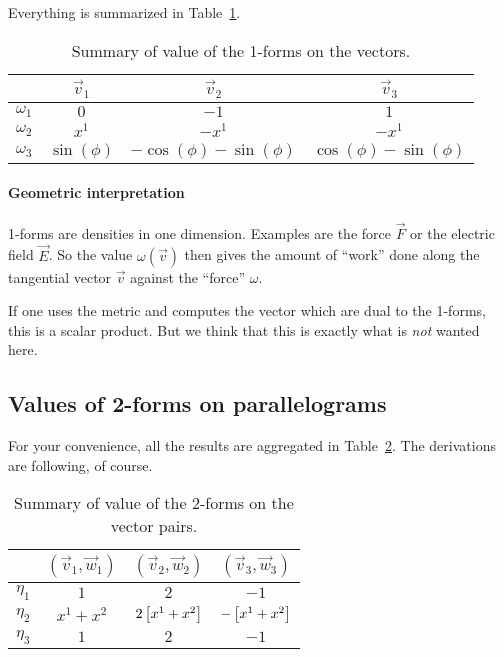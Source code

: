 \documentclass[11pt, english, fleqn, DIV=15, headinclude, BCOR=1cm]{scrartcl}
\begin{document}
Everything is summarized in Table~\ref{tab:values}.

\begin{table}[htbp]
    \centering
    \begin{tabular}{c|ccc}
        & $\vec v_1$ & $\vec v_2$ & $\vec v_3$ \\
        \midrule
        $\omega_1$ & $0$ & $-1$ & $1$ \\
        $\omega_2$ & $x^1$ & $- x^1$ & $- x^1$ \\
        $\omega_3$ & $\sin(\phi)$ & $-\cos(\phi) - \sin(\phi)$ & $\cos(\phi) - \sin(\phi)$ \\
    \end{tabular}
    \caption{%
        Summary of value of the 1-forms on the vectors.
    }
    \label{tab:values}
\end{table}

\paragraph{Geometric interpretation}

1-forms are densities in one dimension. Examples are the force $\vec F$ or the
electric field $\vec E$. So the value $\omega(\vec v)$ then gives the amount of
“work” done along the tangential vector $\vec v$ against the “force” $\omega$.

If one uses the metric and computes the vector which are dual to the 1-forms,
this is a scalar product. But we think that this is exactly what is \emph{not}
wanted here.

\subsection{Values of 2-forms on parallelograms}

For your convenience, all the results are aggregated in
Table~\ref{tab:values2}. The derivations are following, of course.

\begin{table}[htbp]
    \centering
    \begin{tabular}{c|ccc}
        & $(\vec v_1, \vec w_1)$ & $(\vec v_2, \vec w_2)$ & $(\vec v_3, \vec w_3)$ \\
        \midrule
        $\eta_1$ & $1$ & $2$ & $-1$ \\
        $\eta_2$ & $x^1+x^2$ & $2\left[ x^1+x^2 \right]$ & $-\left[ x^1+x^2 \right]$ \\
        $\eta_3$ & $1$ & $2$ & $-1$
    \end{tabular}
    \caption{%
        Summary of value of the 2-forms on the vector pairs.
    }
    \label{tab:values2}
\end{table}
\end{document}
